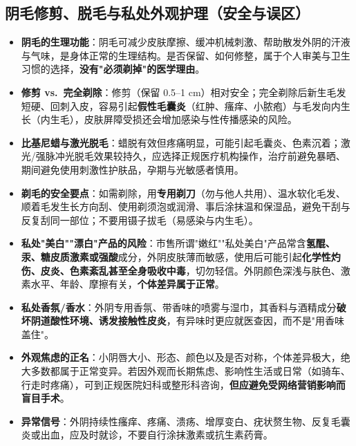 \subsection{阴毛修剪、脱毛与私处外观护理（安全与误区）}

\begin{itemize}
	\item \textbf{阴毛的生理功能}：阴毛可减少皮肤摩擦、缓冲机械刺激、帮助散发外阴的汗液与气味，是身体正常的生理结构。是否保留、如何修整，属于个人审美与卫生习惯的选择，\textbf{没有"必须剃掉"的医学理由}。
	\item \textbf{修剪 vs.\ 完全剃除}：修剪（保留 0.5--1 cm）相对安全；完全剃除后新生毛发短硬、回刺入皮，容易引起\textbf{假性毛囊炎}（红肿、瘙痒、小脓疱）与毛发向内生长（内生毛），皮肤屏障受损还会增加感染与性传播感染的风险。
	\item \textbf{比基尼蜡与激光脱毛}：蜡脱有效但疼痛明显，可能引起毛囊炎、色素沉着；激光/强脉冲光脱毛效果较持久，应选择正规医疗机构操作，治疗前避免暴晒、期间避免使用刺激性护肤品，孕期与光敏感者慎用。
	\item \textbf{剃毛的安全要点}：如需剃除，用\textbf{专用剃刀}（勿与他人共用）、温水软化毛发、顺着毛发生长方向刮、使用剃须泡或润滑、事后涂抹温和保湿品，避免干刮与反复刮同一部位；不要用镊子拔毛（易感染与内生毛）。
	\item \textbf{私处"美白""漂白"产品的风险}：市售所谓"嫩红""私处美白"产品常含\textbf{氢醌、汞、糖皮质激素或强酸}成分，外阴皮肤薄而敏感，使用后可能引起\textbf{化学性灼伤、皮炎、色素紊乱甚至全身吸收中毒}，切勿轻信。外阴颜色深浅与肤色、激素水平、年龄、摩擦有关，\textbf{个体差异属于正常}。
	\item \textbf{私处香氛/香水}：外阴专用香氛、带香味的喷雾与湿巾，其香料与酒精成分\textbf{破坏阴道酸性环境、诱发接触性皮炎}，有异味时更应就医查因，而不是"用香味盖住"。
	\item \textbf{外观焦虑的正名}：小阴唇大小、形态、颜色以及是否对称，个体差异极大，绝大多数都属于正常变异。若因外观而长期焦虑、影响性生活或日常（如骑车、行走时疼痛），可到正规医院妇科或整形科咨询，\textbf{但应避免受网络营销影响而盲目手术}。
	\item \textbf{异常信号}：外阴持续性瘙痒、疼痛、溃疡、增厚变白、疣状赘生物、反复毛囊炎或出血，应及时就诊，不要自行涂抹激素或抗生素药膏。
\end{itemize}
